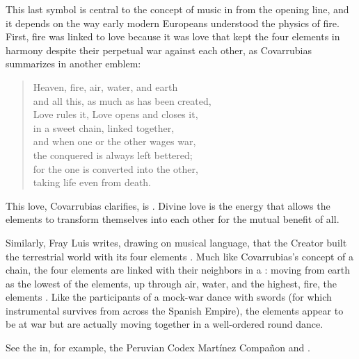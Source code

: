 This last symbol is central to the concept of music in  from the opening line, and it depends on the way early
modern Europeans understood the physics of fire.
First, fire was linked to love because it was love that kept the four
elements in harmony despite their perpetual war against each other, as
Covarrubias summarizes in another emblem:
\begin{quoting}
    \begin{verse}
        Heaven, fire, air, water, and earth\\
        and all this, as much as has been created,\\
        Love rules it, Love opens and closes it,\\
        in a sweet chain, linked together,\\
        and when one or the other wages war,\\
        the conquered is always left bettered;\\
        for the one is converted into the other,\\
        taking life even from death.%
            \Autocite[ I, ]
            {Covarrubias:Emblemas}
    \end{verse}
\end{quoting}
This love, Covarrubias clarifies, is .
Divine love is the energy that allows the elements to transform themselves into
each other for the mutual benefit of all.

Similarly, Fray Luis writes, drawing on musical language, that the Creator
built the terrestrial world with its four elements .%
    \Autocite[204]{LuisdeGranada:Simbolo}
Much like Covarrubias's concept of a chain, the four elements are linked with
their neighbors in a : moving from
earth as the lowest of the elements, up through air, water, and the highest,
fire, the elements .
    \Autocite[204]{LuisdeGranada:Simbolo}
Like the participants of a mock-war dance with swords (for which instrumental
survives from across the Spanish Empire), the elements appear to be at war but
are actually moving together in a well-ordered round dance.%
\begin{Footnote}
    See the  in, for example, the Peruvian Codex
    Martínez Compañon and \autocite{MartinyColl:HuertoAmeno}.
\end{Footnote}

